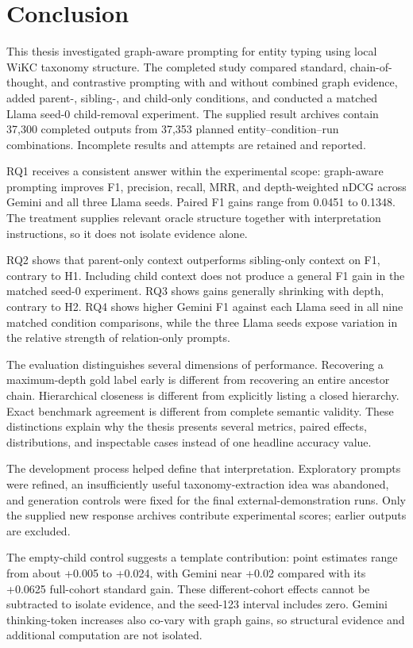 \chapter{Conclusion}

This thesis investigated graph-aware prompting for entity typing using local WiKC taxonomy structure. The completed study compared standard, chain-of-thought, and contrastive prompting with and without combined graph evidence, added parent-, sibling-, and child-only conditions, and conducted a matched Llama seed-0 child-removal experiment. The supplied result archives contain 37,300 completed outputs from 37,353 planned entity–condition–run combinations. Incomplete results and attempts are retained and reported.


RQ1 receives a consistent answer within the experimental scope: graph-aware prompting improves F1, precision, recall, MRR, and depth-weighted nDCG across Gemini and all three Llama seeds. Paired F1 gains range from 0.0451 to 0.1348. The treatment supplies relevant oracle structure together with interpretation instructions, so it does not isolate evidence alone.


RQ2 shows that parent-only context outperforms sibling-only context on F1, contrary to H1. Including child context does not produce a general F1 gain in the matched seed-0 experiment. RQ3 shows gains generally shrinking with depth, contrary to H2. RQ4 shows higher Gemini F1 against each Llama seed in all nine matched condition comparisons, while the three Llama seeds expose variation in the relative strength of relation-only prompts.


The evaluation distinguishes several dimensions of performance. Recovering a maximum-depth gold label early is different from recovering an entire ancestor chain. Hierarchical closeness is different from explicitly listing a closed hierarchy. Exact benchmark agreement is different from complete semantic validity. These distinctions explain why the thesis presents several metrics, paired effects, distributions, and inspectable cases instead of one headline accuracy value.


The development process helped define that interpretation. Exploratory prompts were refined, an insufficiently useful taxonomy-extraction idea was abandoned, and generation controls were fixed for the final external-demonstration runs. Only the supplied new response archives contribute experimental scores; earlier outputs are excluded.


The empty-child control suggests a template contribution: point estimates range from about +0.005 to +0.024, with Gemini near +0.02 compared with its +0.0625 full-cohort standard gain. These different-cohort effects cannot be subtracted to isolate evidence, and the seed-123 interval includes zero. Gemini thinking-token increases also co-vary with graph gains, so structural evidence and additional computation are not isolated.


